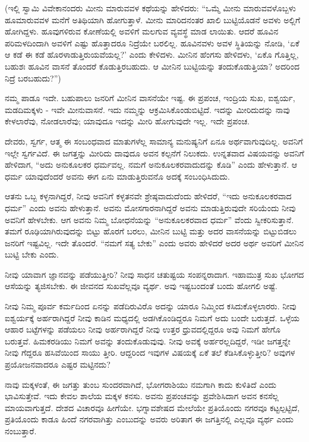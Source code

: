 (ಇಲ್ಲಿ ಸ್ವಾಮಿ ವಿವೇಕಾನಂದರು ಮೀನು ಮಾರುವವಳ ಕಥೆಯನ್ನು ಹೇಳಿದರು: “ಒಮ್ಮೆ ಮೀನು ಮಾರುವವಳೊಬ್ಬಳು ಹೂಮಾರುವವಳ ಮನೆಗೆ ಅತಿಥಿಯಾಗಿ ಹೋಗುತ್ತಾಳೆ. ಮೀನು ಮಾರಿದನಂತರ ಖಾಲಿ ಬುಟ್ಟಿಯೊಡನೆ ಅವಳು ಅಲ್ಲಿಗೆ ಹೋಗಿದ್ದಳು. ಹೂವುಗಳಿರುವ ಕೋಣೆಯಲ್ಲಿ ಅವಳಿಗೆ ಮಲಗುವ ವ್ಯವಸ್ಥೆ ಮಾಡ ಲಾಯಿತು. ಆದರೆ ಹೂವಿನ ಪರಿಮಳದಿಂದಾಗಿ ಅವಳಿಗೆ ಎಷ್ಟು ಹೊತ್ತಾದರೂ ನಿದ್ರೆಯೇ ಬರಲಿಲ್ಲ. ಹೂವಿನವಳು ಅವಳ ಸ್ಥಿತಿಯನ್ನು ನೋಡಿ, ‘ಏಕೆ ಆ ಕಡೆ ಈ ಕಡೆ ಹೊರಳಾಡುತ್ತಿರುಯವೆಯಲ್ಲ?’ ಎಂದು ಕೇಳಿದಳು. ಮೀನಿನ ಹೆಂಗಸು ಹೇಳಿದಳು, ‘ಏಕೊ ಗೊತ್ತಿಲ್ಲ, ಬಹುಶಃ ಹೂವಿನ ವಾಸನೆ ತೊಂದರೆ ಕೊಡುತ್ತಿರಬಹುದು. ಆ ಮೀನಿನ ಬುಟ್ಟಿಯನ್ನು ತಂದುಕೊಡುತ್ತಿಯಾ? ಅದರಿಂದ ನಿದ್ರೆ ಬರಬಹುದು?”)

ನಮ್ಮ ಪಾಡೂ ಇದೇ. ಬಹುಪಾಲು ಜನರಿಗೆ ಮೀನಿನ ವಾಸನೆಯೇ ಇಷ್ಟ. ಈ ಪ್ರಪಂಚ, ಇಂದ್ರಿಯ ಸುಖ, ಐಶ್ವರ್ಯ, ಮಡದಿಮಕ್ಕಳು - ಇವೇ ಮೀನುವಾಸನೆ. ಇದು ನಮ್ಮನ್ನು ಆಕ್ರಮಿಸಿಕೊಂಡುಬಿಟ್ಟಿದೆ. ಇದನ್ನು ಮೀರಿದುದನ್ನು ನಾವು ಕೇಳಲಾರೆವು, ನೋಡಲಾರೆವು; ಯಾವುದೂ ಇದನ್ನು ಮೀರಿ ಹೋಗುವುದೇ ಇಲ್ಲ. ಇದೇ ಪ್ರಪಂಚ.

ದೇವರು, ಸ್ವರ್ಗ, ಆತ್ಮ ಈ ಸಂಬಂಧವಾದ ಮಾತುಗಳೆಲ್ಲ ಸಾಮಾನ್ಯ ಮನುಷ್ಯನಿಗೆ ಏನೂ ಅರ್ಥವಾಗುವುದಿಲ್ಲ. ಅವನಿಗೆ ಇಲ್ಲೇ ಸ್ವರ್ಗವಿದೆ. ಈ ಜಗತ್ತನ್ನು ಮೀರಿದು ದಾವುದೂ ಅವನ ಕಲ್ಪನೆಗೆ ನಿಲುಕದು. ಉನ್ನತವಾದ ವಿಷಯವನ್ನು ಅವನಿಗೆ ಹೇಳಿದಾಗ, “ಅದು ಅನುಕೂಲಕರ ಧರ್ಮವಲ್ಲ. ನಮಗೆ ಅನುಕೂಲಕರವಾದುದನ್ನು ಕೊಡಿ” ಎಂದು ಹೇಳುತ್ತಾನೆ. ಆ ಧರ್ಮ ಯಾವುದೆಂದರೆ ಅವನು ಈಗ ಏನು ಮಾಡುತ್ತಿರುವನೊ ಅದಕ್ಕೆ ಸಂಬಂಧಿಸಿದುದು.

ಆತನು ಒಬ್ಬ ಕಳ್ಳನಾಗಿದ್ದರೆ, ನೀವು ಅವನಿಗೆ ಕಳ್ಳತನವೇ ಶ್ರೇಷ್ಠವಾದುದೆಂದು ಹೇಳಿದರೆ, “ಇದು ಅನುಕೂಲಕರವಾದ ಧರ್ಮ” ಎಂದು ಅವನು ಹೇಳುತ್ತಾನೆ. ಅವನು ಮೋಸಗಾರನಾಗಿದ್ದರೆ ಅವನು ಮಾಡುತ್ತಿರುವುದೇ ಸರಿಯೆಂದು ನೀವು ಅವನಿಗೆ ಹೇಳಬೇಕು. ಆಗ ಅವನು ನಿಮ್ಮ ಬೋಧನೆಯನ್ನು “ಅನುಕೂಲಕರವಾದ ಧರ್ಮ” ವೆಂದು ಸ್ವೀಕರಿಸುತ್ತಾನೆ. ತಮಗೆ ರೂಢಿಯಾಗಿರುವುದನ್ನು ಬಿಟ್ಟು ಹೊರಗೆ ಬರಲು, ಮೀನಿನ ಬುಟ್ಟಿ ಮತ್ತು ಅದರ ವಾಸನೆಯನ್ನು ಬಿಟ್ಟುಬಿಡಲು ಜನರಿಗೆ ಇಷ್ಟವಿಲ್ಲ. ಇದೇ ತೊಂದರೆ. “ನಮಗೆ ಸತ್ಯ ಬೇಕು” ಎಂದು ಅವರು ಹೇಳಿದರೆ ಅದರ ಅರ್ಥ ಅವರಿಗೆ ಮೀನಿನ ಬುಟ್ಟಿ ಬೇಕು ಎಂದು.

ನೀವು ಯಾವಾಗ ಜ್ಞಾನವನ್ನು ಪಡೆಯುತ್ತೀರಿ? ನೀವು ಸಾಧನ ಚತುಷ್ಟಯ ಸಂಪನ್ನರಾದಾಗ. ಇಹಾಮುತ್ರ ಸುಖ ಭೋಗದ ಆಸೆಯನ್ನು ತ್ಯಜಿಸಬೇಕು. ಈ ಜೀವನದ ಸುಖವೆಲ್ಲವೂ ವ್ಯರ್ಥ. ಅವು ಇಷ್ಟಬಂದಂತೆ ಬಂದು ಹೋಗಲಿ ಅಷ್ಟೆ.

ನೀವು ನಿಮ್ಮ ಪೂರ್ವ ಕರ್ಮದಿಂದ ಏನನ್ನು ಪಡೆದಿರುವಿರೊ ಅದನ್ನು ಯಾರೂ ನಿಮ್ಮಿಂದ ಕಸಿದುಕೊಳ್ಳಲಾರರು. ನೀವು ಐಶ್ವರ್ಯಕ್ಕೆ ಅರ್ಹರಾಗಿದ್ದರೆ ನೀವು ಕಾಡಿನ ಮಧ್ಯದಲ್ಲಿ ಅಡಗಿಕೊಂಡಿದ್ದರೂ ನಿಮಗೆ ಅದು ಬಂದೇ ಬರುತ್ತದೆ. ಒಳ್ಳೆಯ ಆಹಾರ ಬಟ್ಟೆಗಳನ್ನು ಪಡೆಯಲು ನೀವು ಅರ್ಹರಾಗಿದ್ದರೆ ನೀವು ಉತ್ತರ ಧ್ರುವದಲ್ಲಿದ್ದರೂ ಅವು ನಿಮಗೆ ಹೇಗೊ ಬರುತ್ತವೆ. ಹಿಮಕರಡಿಯು ನಿಮಗೆ ಅವನ್ನು ತಂದುಕೊಡುವುವು. ನೀವು ಅವಕ್ಕೆ ಅರ್ಹರಲ್ಲದಿದ್ದರೆ, ಇಡೀ ಜಗತ್ತನ್ನೇ ನೀವು ಗೆದ್ದರೂ ಹಸಿವೆಯಿಂದ ಸಾಯು ತ್ತೀರಿ. ಆದ್ದರಿಂದ ಇವುಗಳ ವಿಷಯಕ್ಕೆ ಏಕೆ ತಲೆ ಕೆಡಿಸಿಕೊಳ್ಳುತ್ತೀರಿ? ಅವುಗಳ ಪ್ರಯೋಜನವಾದರೂ ಎಷ್ಟರ ಮಟ್ಟಿನದು?

ನಾವು ಮಕ್ಕಳಂತೆ, ಈ ಜಗತ್ತು ತುಂಬ ಸುಂದರವಾಗಿದೆ, ಭೋಗರಾಶಿಯು ನಮಗಾಗಿ ಕಾದು ಕುಳಿತಿದೆ ಎಂದು ಭಾವಿಸುತ್ತೇವೆ. ಇದು ಕೇವಲ ಶಾಲೆಯ ಮಕ್ಕಳ ಕನಸು. ಅವನು ಪ್ರಪಂಚವನ್ನು ಪ್ರವೇಶಿಸಿದಾಗ ಅವನ ಕನಸೆಲ್ಲ ಮಾಯವಾಗುತ್ತದೆ. ದೇಶದ ವಿಚಾರವೂ ಹೀಗೆಯೇ. ಭಗ್ನಾವಶೇಷದ ಮೇಲೆಯೇ ಪ್ರತಿಯೊಂದು ನಗರವೂ ಕಟ್ಟಲ್ಪಟ್ಟಿದೆ, ಪ್ರತಿಯೊಂದು ಕಾಡೂ ಹಿಂದೆ ನಗರವಾಗಿತ್ತು ಎಂಬುದನ್ನು ಅವರು ಅರಿತಾಗ ಈ ಜಗತ್ತಿನಲ್ಲಿ ಎಲ್ಲವೂ ವ್ಯರ್ಥ ಎಂದು ನಂಬುತ್ತಾರೆ.

